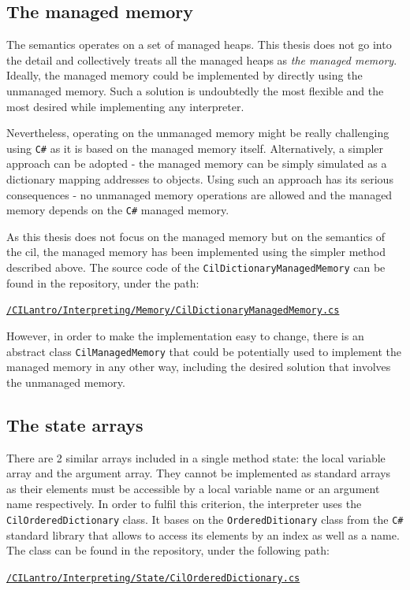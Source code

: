 \documentclass[declaration,shortabstract,english,mgr]{iithesis}
\begin{document}
\subsection{The managed memory}
\label{sec:managedMemory}

The semantics operates on a set of managed heaps. This thesis does not go into the detail and collectively treats all the managed heaps as \textit{the managed memory}. Ideally, the managed memory could be implemented by directly using the unmanaged memory. Such a solution is undoubtedly the most flexible and the most desired while implementing any interpreter.

Nevertheless, operating on the unmanaged memory might be really challenging using \texttt{C\#} as it is based on the managed memory itself. Alternatively, a simpler approach can be adopted - the managed memory can be simply simulated as a dictionary mapping addresses to objects. Using such an approach has its serious consequences - no unmanaged memory operations are allowed and the managed memory depends on the \texttt{C\#} managed memory.

As this thesis does not focus on the managed memory but on the semantics of the \acrshort{cil}, the managed memory has been implemented using the simpler method described above. The source code of the \texttt{CilDictionaryManagedMemory} can be found in the repository, under the path:
\begin{center}
	\href{https://github.com/kvasnyk/CILantro/blob/master/CILantro/CILantro/Interpreting/Memory/CilDictionaryManagedMemory.cs}{\texttt{/CILantro/Interpreting/Memory/CilDictionaryManagedMemory.cs}}
\end{center}

However, in order to make the implementation easy to change, there is an abstract class \texttt{CilManagedMemory} that could be potentially used to implement the managed memory in any other way, including the desired solution that involves the unmanaged memory.

\subsection{The state arrays}

There are 2 similar arrays included in a single method state: the local variable array and the argument array. They cannot be implemented as standard arrays as their elements must be accessible by a local variable name or an argument name respectively. In order to fulfil this criterion, the interpreter uses the \texttt{CilOrderedDictionary} class. It bases on the \texttt{OrderedDitionary} class from the \texttt{C\#} standard library that allows to access its elements by an index as well as a name. The class can be found in the repository, under the following path:
\begin{center}
	\href{https://github.com/kvasnyk/CILantro/blob/master/CILantro/CILantro/Interpreting/State/CilOrderedDictionary.cs}{\texttt{/CILantro/Interpreting/State/CilOrderedDictionary.cs}}
\end{center}
\end{document}
